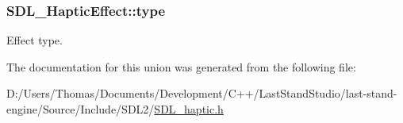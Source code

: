 \subsubsection[{type}]{ S\+D\+L\+\_\+\+Haptic\+Effect\+::type}\label{unionSDL__HapticEffect_a5ff6cfd8da91537091e9a6c2108cb179}
Effect type. 

The documentation for this union was generated from the following file\+:\begin{DoxyCompactItemize}
\item 
D\+:/\+Users/\+Thomas/\+Documents/\+Development/\+C++/\+Last\+Stand\+Studio/last-\/stand-\/engine/\+Source/\+Include/\+S\+D\+L2/\hyperlink{SDL__haptic_8h}{S\+D\+L\+\_\+haptic.\+h}\end{DoxyCompactItemize}
